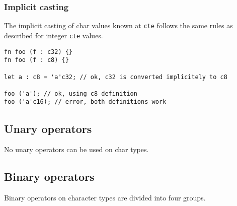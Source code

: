 \subsubsection{Implicit casting}

The implicit casting of char values known at \texttt{cte} follows the same
rules as described for integer \texttt{cte} values.

\begin{lstlisting}[style=coloredverbatim]
fn foo (f : c32) {}
fn foo (f : c8) {}

let a : c8 = 'a'c32; // ok, c32 is converted implicitely to c8

foo ('a'); // ok, using c8 definition
foo ('a'c16); // error, both definitions work
\end{lstlisting}

\subsection{Unary operators}
\label{sec:org78546fb}

No unary operators can be used on char types.

\subsection{Binary operators}
\label{sec:orge863f7d}

Binary operators on character types are divided into four groups.

